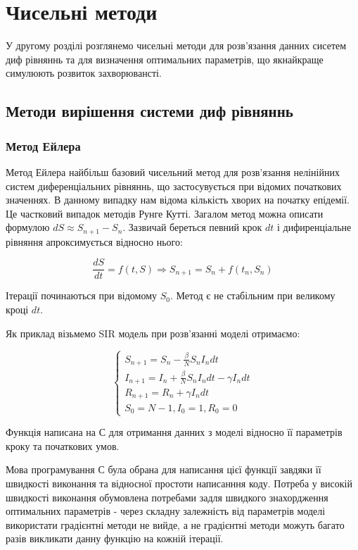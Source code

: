 
\chapter{Чисельні методи}


У другому розділі розглянемо чисельні методи для розв'язання 
данних сисетем диф рівняннь та для визначення оптимальних параметрів, що 
якнайкраще симулюють розвиток захворювансті.

\section{Методи вирішення системи диф рівняннь}

\subsection{Метод Ейлера}


Метод Ейлера найбільш базовий чисельний метод для розв'язання нелінійних
систем диференціальних рівняннь, що застосувується при відомих початкових
значеннях. 
В данному випадку нам відома кількість хворих на початку епідемії.
Це частковий випадок методів Рунге Кутті. 
Загалом метод можна описати формулою $dS \approx S_{n+1} - S_n$.
Зазвичай береться певний крок $dt$ і дифиренціальне рівняння 
апроксимується відносно нього:

$$\frac{dS}{dt} = f(t, S) \Rightarrow 
S_{n+1} = S_n + f(t_n, S_n)$$

Ітерації починаються при відомому $S_0$. Метод є не стабільним при великому 
кроці $dt$.

Як приклад візьмемо SIR модель при розв'язанні моделі отримаємо:

$$
\begin{cases}
    S_{n+1} = S_n - \frac{\beta}{N} S_n I_n dt \\
    I_{n+1} = I_n + \frac{\beta}{N} S_n I_n dt - \gamma I_n dt \\
    R_{n+1} = R_n + \gamma I_n dt \\
    S_0 = N - 1, I_0 = 1, R_0 = 0
\end{cases}
$$

\pagebreak

Функція написана на С для отримання данних з моделі відносно її параметрів 
кроку та початкових умов. 


Мова програмування С була обрана для написання 
цієї функції завдяки її швидкості виконання та відносної простоти 
написанння коду. Потреба у високій швидкості виконання обумовлена потребами 
задля швидкого знахордження оптимальних параметрів - через складну 
залежність від параметрів моделі використати градієнтні методи не вийде, а
не градієнтні методи можуть багато разів викликати данну функцію на кожній 
ітерації. 


